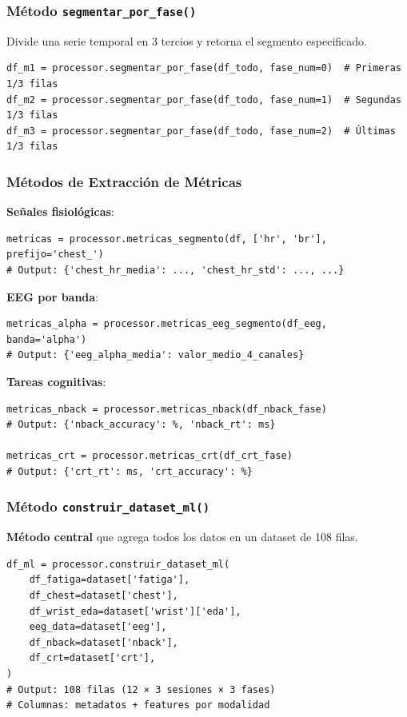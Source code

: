 \documentclass[12pt,a4paper]{article}
\begin{document}
\subsubsection{Método \texttt{segmentar\_por\_fase()}}

Divide una serie temporal en 3 tercios y retorna el segmento especificado.

\begin{lstlisting}
df_m1 = processor.segmentar_por_fase(df_todo, fase_num=0)  # Primeras 1/3 filas
df_m2 = processor.segmentar_por_fase(df_todo, fase_num=1)  # Segundas 1/3 filas
df_m3 = processor.segmentar_por_fase(df_todo, fase_num=2)  # Últimas 1/3 filas
\end{lstlisting}

\subsubsection{Métodos de Extracción de Métricas}

\textbf{Señales fisiológicas}:
\begin{lstlisting}
metricas = processor.metricas_segmento(df, ['hr', 'br'], prefijo='chest_')
# Output: {'chest_hr_media': ..., 'chest_hr_std': ..., ...}
\end{lstlisting}

\textbf{EEG por banda}:
\begin{lstlisting}
metricas_alpha = processor.metricas_eeg_segmento(df_eeg, banda='alpha')
# Output: {'eeg_alpha_media': valor_medio_4_canales}
\end{lstlisting}

\textbf{Tareas cognitivas}:
\begin{lstlisting}
metricas_nback = processor.metricas_nback(df_nback_fase)
# Output: {'nback_accuracy': %, 'nback_rt': ms}

metricas_crt = processor.metricas_crt(df_crt_fase)
# Output: {'crt_rt': ms, 'crt_accuracy': %}
\end{lstlisting}

\subsubsection{Método \texttt{construir\_dataset\_ml()}}

\textbf{Método central} que agrega todos los datos en un dataset de 108 filas.

\begin{lstlisting}
df_ml = processor.construir_dataset_ml(
    df_fatiga=dataset['fatiga'],
    df_chest=dataset['chest'],
    df_wrist_eda=dataset['wrist']['eda'],
    eeg_data=dataset['eeg'],
    df_nback=dataset['nback'],
    df_crt=dataset['crt'],
)
# Output: 108 filas (12 × 3 sesiones × 3 fases)
# Columnas: metadatos + features por modalidad
\end{lstlisting}
\end{document}
